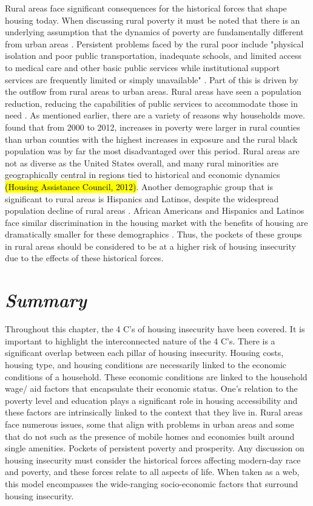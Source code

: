  Rural areas face significant consequences for the historical forces that shape housing today. When discussing rural poverty it must be noted that there is an underlying assumption that the dynamics of poverty are fundamentally different from urban areas \citep{thiede_spatial_2018}. Persistent problems faced by the rural poor include "physical isolation and poor public transportation, inadequate schools, and limited access to medical care and other basic public services while institutional support services are frequently limited or simply unavailable" \citep[?]{lichter_changing_2007}. Part of this is driven by the outflow from rural areas to urban areas. Rural areas have seen a population reduction, reducing the capabilities of public services to accommodate those in need \citep{bjerke_mover_2019}. As mentioned earlier, there are a variety of reasons why households move. \citet{thiede_spatial_2018} found that from 2000 to 2012, increases in poverty were larger in rural counties than urban counties with the highest increases in exposure and the rural black population was by far the most disadvantaged over this period. Rural areas are not as diverse as the United States overall, and many rural minorities are geographically central in regions tied to historical and economic dynamics \hl{(Housing Assistance Council, 2012)}. Another demographic group that is significant to rural areas is Hispanics and Latinos, despite the widespread population decline of rural areas \citep{lichter_demographic_2020}. African Americans and Hispanics and Latinos face similar discrimination in the housing market with the benefits of housing are dramatically smaller for these demographics \citep{krivo_housing_2004}. Thus, the pockets of these groups in rural areas should be considered to be at a higher risk of housing insecurity due to the effects of these historical forces. 

 
 
\section{\textit{Summary}}

Throughout this chapter, the 4 C's of housing insecurity have been covered. It is important to highlight the interconnected nature of the 4 C's. There is a significant overlap between each pillar of housing insecurity. Housing costs, housing type, and housing conditions are necessarily linked to the economic conditions of a household. These economic conditions are linked to the household wage/ aid factors that encapsulate their economic status. One's relation to the poverty level and education plays a significant role in housing accessibility and these factors are intrinsically linked to the context that they live in. Rural areas face numerous issues, some that align with problems in urban areas and some that do not such as the presence of mobile homes and economies built around single amenities. Pockets of persistent poverty and prosperity. Any discussion on housing insecurity must consider the historical forces affecting modern-day race and poverty, and these forces relate to all aspects of life. When taken as a web, this model encompasses the wide-ranging socio-economic factors that surround housing insecurity. 

\endinput